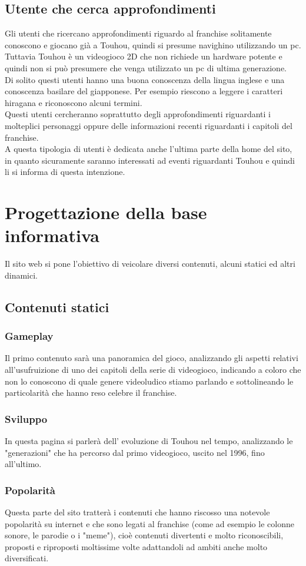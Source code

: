 \documentclass[openany, a4paper, 12pt]{report}
\begin{document}
		\subsection{Utente che cerca approfondimenti}
		Gli utenti che ricercano approfondimenti riguardo al franchise solitamente conoscono e giocano già a Touhou, quindi si presume navighino utilizzando un pc. Tuttavia Touhou è un videogioco 2D che non richiede un hardware potente e quindi non si può presumere che venga utilizzato un pc di ultima generazione.\\
		Di solito questi utenti hanno una buona conoscenza della lingua inglese e una conoscenza basilare del giapponese. Per esempio riescono a leggere i caratteri hiragana e riconoscono alcuni termini.\\
		Questi utenti cercheranno soprattutto degli approfondimenti riguardanti i molteplici personaggi oppure delle informazioni recenti riguardanti i capitoli del franchise.\\
		A questa tipologia di utenti è dedicata anche l'ultima parte della home del sito, in quanto sicuramente saranno interessati ad eventi riguardanti Touhou e quindi li si informa di questa intenzione.

	\section{Progettazione della base informativa}
		Il sito web si pone l'obiettivo di veicolare diversi contenuti, alcuni statici ed altri dinamici.
	\subsection{Contenuti statici}
		\subsubsection{Gameplay}
		Il primo contenuto sarà una panoramica del gioco, analizzando gli aspetti relativi all'usufruizione di uno dei capitoli della serie di videogioco, indicando a coloro che non lo conoscono di quale genere videoludico stiamo parlando e sottolineando le particolarità che hanno reso celebre il franchise.
		\subsubsection{Sviluppo}
		In questa pagina si parlerà dell' evoluzione di Touhou nel tempo, analizzando le "generazioni" che ha percorso dal primo videogioco, uscito nel 1996, fino all'ultimo.
		\subsubsection{Popolarità}
		Questa parte del sito tratterà i contenuti che hanno riscosso una notevole popolarità su internet e che sono legati al franchise (come ad esempio le colonne sonore, le parodie o i "meme"), cioè contenuti divertenti e molto riconoscibili, proposti e riproposti moltissime volte adattandoli ad ambiti anche molto diversificati.
\end{document}
